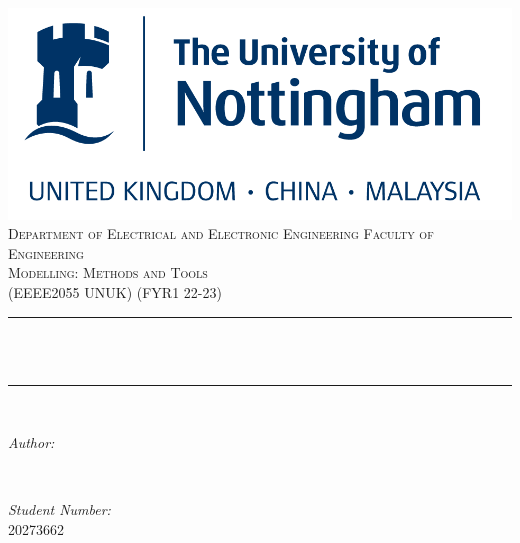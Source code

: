 \begin{titlepage}
    \centering
    \includegraphics[scale = 0.4]{Config/uon.png}\\[1.0 cm]	%

    
    \textsc{\Large Department of Electrical and Electronic Engineering
    Faculty of Engineering}\\[1.5 cm]	%
    \textsc{\large Modelling: Methods and Tools}\\[0.5 cm]				%
    \textsc{\large (EEEE2055 UNUK) (FYR1 22-23)}\\[0.5 cm]				%

    \rule{\linewidth}{0.2 mm} \\[0.4 cm]
    { \huge \bfseries \thetitle}\\
    \rule{\linewidth}{0.2 mm} \\[1.5 cm]

    \begin{minipage}{0.4\textwidth}
        \begin{flushleft} \large
            \emph{Author:}\\
            \theauthor
        \end{flushleft}
    \end{minipage}~
    \begin{minipage}{0.4\textwidth}
        \begin{flushright} \large
            \emph{Student Number:} \\
            20273662									%
        \end{flushright}
    \end{minipage}\\[1.5 cm]

    {\large \thedate}\\[0 cm]

    \vfill

\end{titlepage}